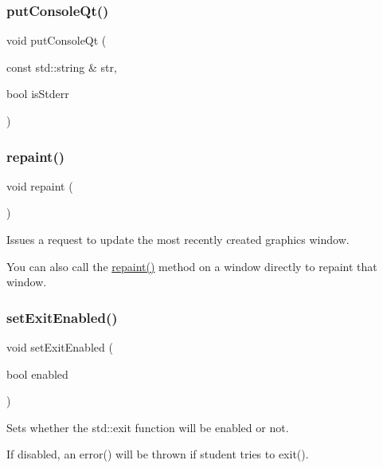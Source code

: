 \subsubsection{\texorpdfstring{put\+Console\+Qt()}{putConsoleQt()}}
{\footnotesize\ttfamily void put\+Console\+Qt (\begin{DoxyParamCaption}\item[{const std\+::string \&}]{str,  }\item[{bool}]{is\+Stderr }\end{DoxyParamCaption})}

\mbox{\label{namespacesgl_ac827b978aa122f136a14c198687ad80f}} 
\subsubsection{\texorpdfstring{repaint()}{repaint()}}
{\footnotesize\ttfamily void repaint (\begin{DoxyParamCaption}{ }\end{DoxyParamCaption})}



Issues a request to update the most recently created graphics window. 

You can also call the \mbox{\hyperlink{namespacesgl_ac827b978aa122f136a14c198687ad80f}{repaint()}} method on a window directly to repaint that window. \mbox{\label{namespacesgl_afa57f85846177bb4ed2b4b12fa8a758d}} 
\subsubsection{\texorpdfstring{set\+Exit\+Enabled()}{setExitEnabled()}}
{\footnotesize\ttfamily void set\+Exit\+Enabled (\begin{DoxyParamCaption}\item[{bool}]{enabled }\end{DoxyParamCaption})}



Sets whether the std\+::exit function will be enabled or not. 

If disabled, an error() will be thrown if student tries to exit(). \mbox{\label{namespacesgl_a2937cb1c4385064875d0cb29fcdfeae6}} 
